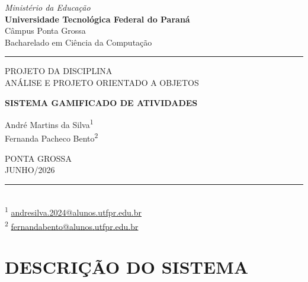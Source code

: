 \documentclass[12pt, a4paper]{article}
\begin{document}
 
\begin{titlepage}
  \begin{center}
    \begin{minipage}{0.6\textwidth}
      \centering\scriptsize
      \textit{Ministério da Educação}\\
      \textbf{Universidade Tecnológica Federal do Paraná}\\
      Câmpus Ponta Grossa\\
      Bacharelado em Ciência da Computação
    \end{minipage}
 
    \rule{\linewidth}{0.4pt}
    \vspace{3cm}
 
    PROJETO DA DISCIPLINA\\[0.3cm]
    ANÁLISE E PROJETO ORIENTADO A OBJETOS
 
    \vspace{4cm}
 
    {\LARGE\bfseries SISTEMA GAMIFICADO DE ATIVIDADES}
 
    \vspace{3cm}
 
    André Martins da Silva\textsuperscript{1}\\[0.3cm]
    Fernanda Pacheco Bento\textsuperscript{2}
 
    \vfill
 
    PONTA GROSSA\\[0.2cm]
    JUNHO/2026
    \vspace{1cm}
  \end{center}
 
  \noindent\rule{5cm}{0.4pt}\\
  \footnotesize
  \textsuperscript{1} \href{mailto:andresilva.2024@alunos.utfpr.edu.br}{andresilva.2024@alunos.utfpr.edu.br}\\
  \textsuperscript{2} \href{mailto:fernandabento@alunos.utfpr.edu.br}{fernandabento@alunos.utfpr.edu.br}
\end{titlepage}
 
\newpage
\tableofcontents
\newpage
\setcounter{page}{1}
 
\section{DESCRIÇÃO DO SISTEMA}
 
\end{document}
